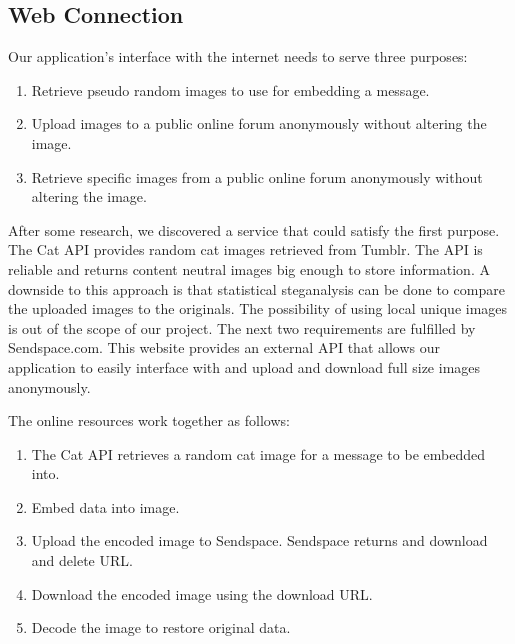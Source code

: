 \subsection{Web Connection}

Our application's interface with the internet needs to serve three purposes:
\begin{enumerate}
\item Retrieve pseudo random images to use for embedding a message. 
\item Upload images to a public online forum anonymously without altering the image.
\item Retrieve specific images from a public online forum anonymously without altering the image. 
\end{enumerate}

After some research, we discovered a service that could satisfy the first purpose. The Cat API provides random cat images retrieved from Tumblr. The API is reliable and returns content neutral images big enough to store information. A downside to this approach is that statistical steganalysis can be done to compare the uploaded images to the originals. The possibility of using local unique images is out of the scope of our project. The next two requirements are fulfilled by Sendspace.com. This website provides an external API that allows our application to easily interface with and upload and download full size images anonymously. 


The online resources work together as follows:
\begin{enumerate}
\item The Cat API retrieves a random cat image for a message to be embedded into.
\item Embed data into image.
\item Upload the encoded image to Sendspace. Sendspace returns and download and delete URL.
\item Download the encoded image using the download URL.
\item Decode the image to restore original data. 
\end{enumerate}